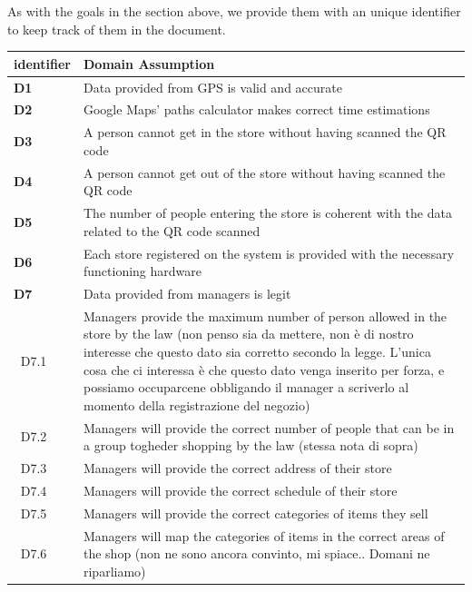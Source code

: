 As with the goals in the section above, we provide them with an unique identifier to keep track of them in the document.

\begin{table}[h!]
    \centering
    \begin{tabular}{@{}P{0.1\textwidth}P{0.80\textwidth}@{}}
        \toprule
        \textbf{identifier}& \textbf{Domain Assumption}\\
        \midrule
        \textbf{D1}        & Data provided from GPS is valid and accurate\\
        \textbf{D2}        & Google Maps' paths calculator makes correct time estimations\\
        \textbf{D3}        & A person cannot get in the store without having scanned the QR code\\
        \textbf{D4}        & A person cannot get out of the store without having scanned the QR code\\
        \textbf{D5}        & The number of people entering the store is coherent with the data related to the QR code scanned\\
        \textbf{D6}        & Each store registered on the system is provided with the necessary functioning hardware\\
        \textbf{D7}        & Data provided from managers is legit\\
        $\;\;$D7.1         & Managers provide the maximum number of person allowed in the store by the law (non penso sia da mettere, non è di nostro interesse che questo dato sia corretto secondo la legge. L'unica cosa che ci interessa è che questo dato venga inserito per forza, e possiamo occuparcene obbligando il manager a scriverlo al momento della registrazione del negozio)\\
        $\;\;$D7.2         & Managers will provide the correct number of people that can be in a group togheder shopping by the law (stessa nota di sopra)\\
        $\;\;$D7.3         & Managers will provide the correct address of their store\\
        $\;\;$D7.4         & Managers will provide the correct schedule of their store\\
        $\;\;$D7.5         & Managers will provide the correct categories of items they sell\\
        $\;\;$D7.6         & Managers will map the categories of items in the correct areas of the shop (non ne sono ancora convinto, mi spiace.. Domani ne riparliamo)\\

\end{tabular}
\end{table}
